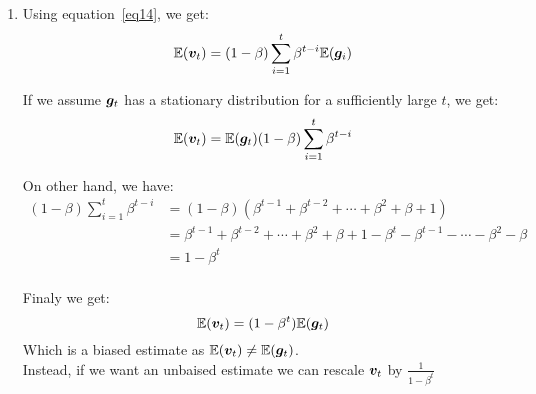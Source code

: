 {\begin{enumerate}
	\item Using equation~\ref{eq14}, we get:
	$$\mathbb{E}({\bm{v}}_t) = (1-\beta)\sum_{i=1}^{t}\beta^{t-i}\mathbb{E}({\bm{g}}_i)$$
	
	If we assume ${\bm{g}}_t$ has a stationary distribution for a sufficiently large $t$, we get:
	$$\mathbb{E}({\bm{v}}_t) = \mathbb{E}({\bm{g}}_t)(1-\beta)\sum_{i=1}^{t}\beta^{t-i}$$
	
	On other hand, we have:
	\begin{equation}
	\begin{split}
	(1-\beta)\sum_{i=1}^{t}\beta^{t-i} & = (1-\beta)(\beta^{t-1}+\beta^{t-2}+\cdots+\beta^2+\beta+1)\\
		& = \beta^{t-1}+\beta^{t-2}+\cdots+\beta^2+\beta+1 - \beta^{t}-\beta^{t-1}-\cdots-\beta^2-\beta\\
		& = 1 - \beta^{t}\\
	\end{split}
	\end{equation}
	
	Finaly we get:
	$$\mathbb{E}({\bm{v}}_t) = (1 - \beta^{t})\mathbb{E}({\bm{g}}_t)$$
	Which is a biased estimate as $\mathbb{E}({\bm{v}}_t) \neq \mathbb{E}({\bm{g}}_t)$.\\
	Instead, if we want an unbaised estimate we can rescale ${\bm{v}}_t$ by $\frac{1}{1-\beta^{t}}$
	
	
	\end{enumerate}
}


